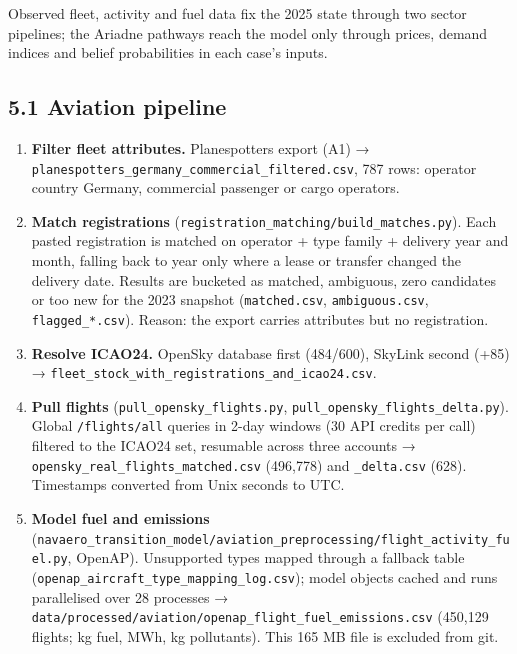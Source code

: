 \documentclass[11pt,a4paper]{article}
\begin{document}
Observed fleet, activity and fuel data fix the 2025 state through two sector pipelines; the Ariadne pathways reach the model only through prices, demand indices and belief probabilities in each case's inputs.

\subsection*{5.1 Aviation pipeline}

\begin{enumerate}
\item{} \textbf{Filter fleet attributes.} Planespotters export (A1) → \texttt{planespotters\_\allowbreak{}germany\_\allowbreak{}commercial\_\allowbreak{}filtered.\allowbreak{}csv}, 787 rows: operator country Germany, commercial passenger or cargo operators.
\item{} \textbf{Match registrations} (\texttt{registration\_\allowbreak{}matching/\allowbreak{}build\_\allowbreak{}matches.\allowbreak{}py}). Each pasted registration is matched on operator + type family + delivery year and month, falling back to year only where a lease or transfer changed the delivery date. Results are bucketed as matched, ambiguous, zero candidates or too new for the 2023 snapshot (\texttt{matched.\allowbreak{}csv}, \texttt{ambiguous.\allowbreak{}csv}, \texttt{flagged\_\allowbreak{}*.\allowbreak{}csv}). Reason: the export carries attributes but no registration.
\item{} \textbf{Resolve ICAO24.} OpenSky database first (484/600), SkyLink second (+85) → \texttt{fleet\_\allowbreak{}stock\_\allowbreak{}with\_\allowbreak{}registrations\_\allowbreak{}and\_\allowbreak{}icao24.\allowbreak{}csv}.
\item{} \textbf{Pull flights} (\texttt{pull\_\allowbreak{}opensky\_\allowbreak{}flights.\allowbreak{}py}, \texttt{pull\_\allowbreak{}opensky\_\allowbreak{}flights\_\allowbreak{}delta.\allowbreak{}py}). Global \texttt{/\allowbreak{}flights/\allowbreak{}all} queries in 2-day windows (30 API credits per call) filtered to the ICAO24 set, resumable across three accounts → \texttt{opensky\_\allowbreak{}real\_\allowbreak{}flights\_\allowbreak{}matched.\allowbreak{}csv} (496,778) and \texttt{\_\allowbreak{}delta.\allowbreak{}csv} (628). Timestamps converted from Unix seconds to UTC.
\item{} \textbf{Model fuel and emissions} (\texttt{navaero\_\allowbreak{}transition\_\allowbreak{}model/\allowbreak{}aviation\_\allowbreak{}preprocessing/\allowbreak{}flight\_\allowbreak{}activity\_\allowbreak{}fuel.\allowbreak{}py}, OpenAP). Unsupported types mapped through a fallback table (\texttt{openap\_\allowbreak{}aircraft\_\allowbreak{}type\_\allowbreak{}mapping\_\allowbreak{}log.\allowbreak{}csv}); model objects cached and runs parallelised over 28 processes → \texttt{data/\allowbreak{}processed/\allowbreak{}aviation/\allowbreak{}openap\_\allowbreak{}flight\_\allowbreak{}fuel\_\allowbreak{}emissions.\allowbreak{}csv} (450,129 flights; kg fuel, MWh, kg pollutants). This 165 MB file is excluded from git.

\end{enumerate}
\end{document}
